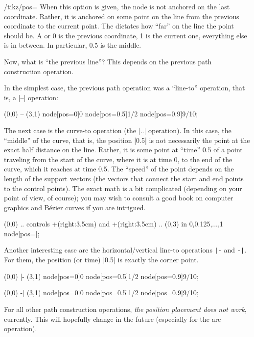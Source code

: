 \label{section-pos-option}

\begin{key}{/tikz/pos=}
  When this option is given, the node is not anchored on the last
  coordinate. Rather, it is anchored on some point on the line from
  the previous coordinate to the current point. The 
  dictates how ``far'' on the line the point should be. A
   or 0 is the previous coordinate, 1 is the current
  one, everything else is in between. In particular, 0.5 is the
  middle.

  Now, what is ``the previous line''? This depends on the previous
  path construction operation.

  In the simplest case, the previous path operation was a ``line-to''
  operation, that is, a  |--| operation:
\begin{codeexample}[]
\tikz \draw (0,0) -- (3,1)
    node[pos=0]{0} node[pos=0.5]{1/2} node[pos=0.9]{9/10};
\end{codeexample}

  The next case is the curve-to operation (the |..| operation). In this
  case, the ``middle'' of the curve, that is, the position |0.5| is
  not necessarily the point at the exact half distance on the
  line. Rather, it is some point at ``time'' 0.5 of a point traveling
  from the start of the curve, where it is at time 0, to the end of
  the curve, which it reaches at time 0.5. The ``speed'' of the point
  depends on the length of the support vectors (the vectors that
  connect the start and end points to the control points). The exact
  math is a bit complicated (depending on your point of view, of
  course); you may wish to consult a good book on computer graphics
  and Bézier curves if you are intrigued.
\begin{codeexample}[]
  \tikz \draw (0,0) .. controls +(right:3.5cm) and +(right:3.5cm) .. (0,3)
    \foreach \p in {0,0.125,...,1} {node[pos=\p]{\p}};
\end{codeexample}

  Another interesting case are the horizontal/vertical line-to operations
  \verb!|-! and \verb!-|!. For them, the position (or time) |0.5| is
  exactly the corner point.

\begin{codeexample}[]
\tikz \draw (0,0) |- (3,1)
  node[pos=0]{0} node[pos=0.5]{1/2} node[pos=0.9]{9/10};
\end{codeexample}

\begin{codeexample}[]
\tikz \draw (0,0) -| (3,1)
  node[pos=0]{0} node[pos=0.5]{1/2} node[pos=0.9]{9/10};
\end{codeexample}

  For all other path construction operations, \emph{the position
  placement does not work}, currently. This will hopefully change in
  the future (especially for the arc operation).
\end{key}


